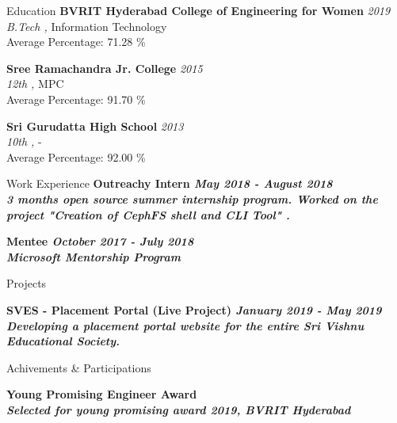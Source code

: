 \documentclass{resume}
\begin{document}
   
   
   
   \begin{rSection}{Education}
    {\bf BVRIT Hyderabad College of Engineering for Women} \hfill {\em 2019 } \\
	   {\sl B.Tech ,} Information Technology\\
	   Average Percentage: 71.28 \% 
		
	    {\bf Sree Ramachandra Jr. College} \hfill {\em 2015 } \\
	   {\sl 12th ,} MPC\\
	   Average Percentage: 91.70 \% 
		
	    {\bf Sri Gurudatta High School} \hfill {\em 2013 } \\
	   {\sl 10th ,} -\\
	   Average Percentage: 92.00 \% 
		
	   
   \end{rSection}
   
   
   \begin{rSection}{Work Experience}
     \bf Outreachy Intern \hfill {\em May 2018 - August 2018 } \\
	   \sl 3 months open source summer internship program. Worked on the project "Creation of CephFS shell and CLI Tool" .
	   \
	   
	     \bf Mentee \hfill {\em October 2017 - July 2018 } \\
	   \sl Microsoft Mentorship Program
	   \
	   
	   
 
   \end{rSection}
   
   \begin{rSection}{Projects}
   

    \bf SVES - Placement Portal (Live Project) \hfill{\em January 2019 - May 2019}\\
	\textit{ Developing a placement portal website for the entire Sri Vishnu Educational Society.}\\
	
	
   \end{rSection}
   
   
   \begin{rSection}{Achivements \& Participations}

   \bf Young Promising Engineer Award\\
	   \sl  Selected for young promising award 2019, BVRIT Hyderabad\\
   \end{rSection}
   
\end{document}
